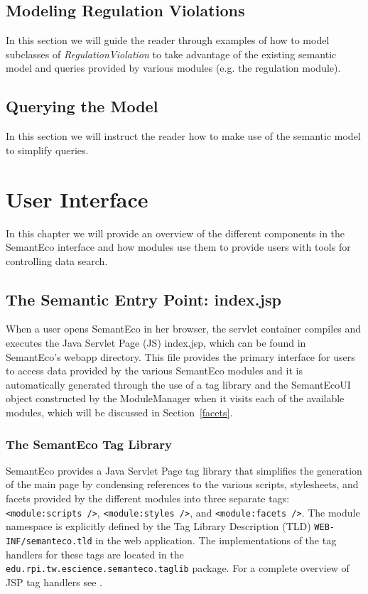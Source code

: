 \documentclass[letterpaper]{report}
\begin{document}
\section{Modeling Regulation Violations}
\label{regulation-violation}
In this section we will guide the reader through examples of how to model subclasses of \textit{RegulationViolation} to take advantage of the existing semantic model and queries provided by various modules (e.g. the regulation module).
\section{Querying the Model}
\label{querying}
In this section we will instruct the reader how to make use of the semantic model to simplify queries.


\chapter{User Interface}
\label{user-interface}
In this chapter we will provide an overview of the different components in the SemantEco interface and how modules use them to provide users with tools for controlling data search.

\section{The Semantic Entry Point: index.jsp} 
When a user opens SemantEco in her browser, the servlet container compiles and executes the Java Servlet Page (JS) index.jsp, which can be found in SemantEco's webapp directory. This file provides the primary interface for users to access data provided by the various SemantEco modules and it is automatically generated through the use of a tag library and the SemantEcoUI object constructed by the ModuleManager when it visits each of the available modules, which will be discussed in Section~\ref{facets}.

\subsection{The SemantEco Tag Library}
SemantEco provides a Java Servlet Page tag library that simplifies the generation of the main page by condensing references to the various scripts, stylesheets, and facets provided by the different modules into three separate tags: \texttt{<module:scripts />}, \texttt{<module:styles />}, and \texttt{<module:facets />}. The module namespace is explicitly defined by the Tag Library Description (TLD) \texttt{WEB-INF/semanteco.tld} in the web application. The implementations of the tag handlers for these tags are located in the \texttt{edu.rpi.tw.escience.semanteco.taglib} package. For a complete overview of JSP tag handlers see \cite{JSPTagHandlers}.
\end{document}
